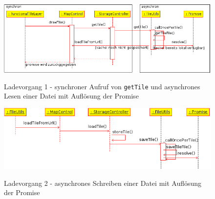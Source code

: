   \begin{figure}[H]
      \centering
	  \includegraphics[scale=0.7]{bilder/uml/loadTile.png}\\ 
  	  \caption{Ladevorgang 1 - synchroner Aufruf von \texttt{getTile} und asynchrones Lesen einer Datei mit Auflösung der Promise}
  \end{figure}
  \begin{figure}[H]
      \centering
	  \includegraphics[scale=0.7]{bilder/uml/saveTile.png}\\ 
  	  \caption{Ladevorgang 2 - asynchrones Schreiben einer Datei mit Auflösung der Promise}
  \end{figure}


